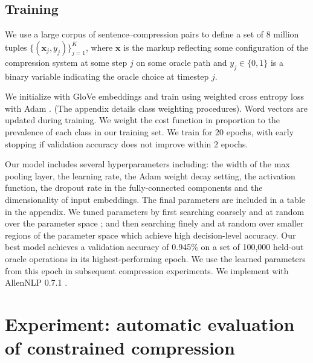 \documentclass[11pt,a4paper]{article}
\begin{document}
\subsection{Training}

We use a large corpus of sentence--compression pairs \cite{filippova2013overcoming} to define a set of 8 million tuples $\{(\bm{x}_j, y_j) \}_{j=1}^{K}$, where $\bm{x}$ is the markup reflecting some configuration of the compression system at some step $j$ on some oracle path and $y_j \in \{0,1\}$ is a binary variable indicating the oracle choice at timestep $j$.

We initialize with GloVe embeddings \cite{pennington2014glove} and train using weighted cross entropy loss with Adam \cite{Kingma2014AdamAM}. (The appendix details class weighting procedures). Word vectors are updated during training. We weight the cost function in proportion to the prevalence of each class in our training set. We train for 20 epochs, with early stopping if validation accuracy does not improve within 2 epochs.

Our model includes several hyperparameters including: the width of the max pooling layer, the learning rate, the Adam weight decay setting, the activation function, the dropout rate in the fully-connected components and the dimensionality of input embeddings. The final parameters are included in a table in the appendix. We tuned parameters by first searching coarsely and at random over the parameter space \cite{Bergstra2012RandomSF}; and then searching finely and at random over smaller regions of the parameter space which achieve high decision-level accuracy. Our best model achieves a validation accuracy of 0.945\% on a set of 100,000 held-out oracle operations in its highest-performing epoch. We use the learned parameters from this epoch in subsequent compression experiments. We implement with AllenNLP 0.7.1 \cite{Gardner2017AllenNLP}.

\section{Experiment: automatic evaluation of constrained compression}\label{s:autoeval}
\end{document}
